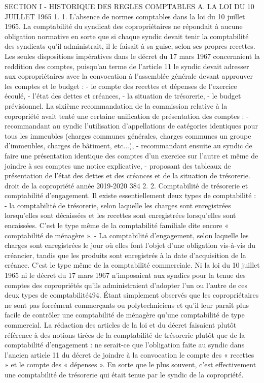 SECTION I - HISTORIQUE DES REGLES COMPTABLES
A. LA LOI DU 10 JUILLET 1965
1. 1. L'absence de normes comptables dans la loi du 10 juillet 1965.
La comptabilité du syndicat des copropriétaires ne répondait à aucune obligation normative en sorte que si chaque syndic devait tenir la comptabilité des syndicats qu’il administrait, il le faisait à sa guise, selon ses propres recettes.
Les seules dispositions impératives dans le décret du 17 mars 1967 concernaient la reddition des comptes, puisqu'au terme de l'article 11 le syndic devait adresser aux copropriétaires avec la convocation à l'assemblée générale devant approuver les comptes et le budget :
- le compte des recettes et dépenses de l'exercice écoulé,
- l'état des dettes et créances,
- la situation de trésorerie,
- le budget prévisionnel.
La sixième recommandation de la commission relative à la copropriété avait tenté une certaine unification de présentation des comptes :
- recommandant au syndic l'utilisation d'appellations de catégories identiques pour tous les immeubles (charges communes générales, charges communes un groupe d'immeubles, charges de bâtiment, etc...),
- recommandant ensuite au syndic de faire une présentation identique des comptes d'un exercice sur l'autre et même de joindre à ses comptes une notice explicative,
- proposant des tableaux de présentation de l'état des dettes et des créances et de la situation de trésorerie.
droit de la copropriété année 2019-2020
384
2. 2. Comptabilité de trésorerie et comptabilité d'engagement.
Il existe essentiellement deux types de comptabilité :
- la comptabilité de trésorerie, selon laquelle les charges sont enregistrées lorsqu’elles sont décaissées et les recettes sont enregistrées lorsqu’elles sont encaissées. C'est le type même de la comptabilité familiale dite encore « comptabilité de ménagère ».
- La comptabilité d'engagement, selon laquelle les charges sont enregistrées le jour où elles font l'objet d'une obligation vis-à-vis du créancier, tandis que les produits sont enregistrés à la date d'acquisition de la créance. C'est le type même de la comptabilité commerciale.
Ni la loi du 10 juillet 1965 ni le décret du 17 mars 1967 n'imposaient aux syndics pour la tenue des comptes des copropriétés qu'ils administraient d'adopter l'un ou l'autre de ces deux types de comptabilité494. Étant simplement observés que les copropriétaires ne sont pas forcément commerçants ou polytechniciens et qu’il leur paraît plus facile de contrôler une comptabilité de ménagère qu’une comptabilité de type commercial.
La rédaction des articles de la loi et du décret faisaient plutôt référence à des notions tirées de la comptabilité de trésorerie plutôt que de la comptabilité d'engagement : ne serait-ce que l'obligation faite au syndic dans l'ancien article 11 du décret de joindre à la convocation le compte des « recettes » et le compte des « dépenses ». En sorte que le plus souvent, c'est effectivement une comptabilité de trésorerie qui était tenue par le syndic de la copropriété.
